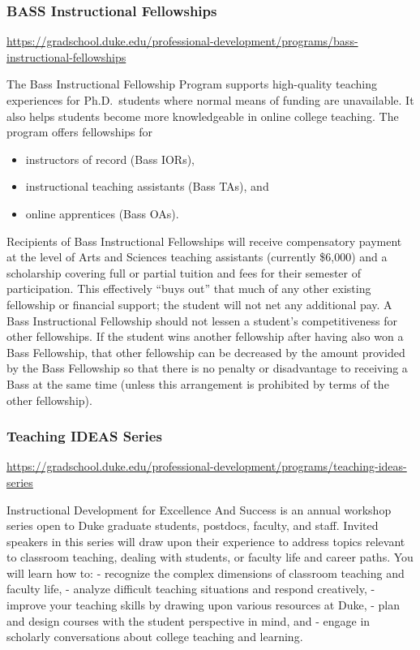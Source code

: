 \documentclass[
]{article}
\providecommand{\tightlist}{%
  \setlength{\itemsep}{0pt}\setlength{\parskip}{0pt}}
\begin{document}
\hypertarget{bass-instructional-fellowships}{%
\subsubsection{BASS Instructional Fellowships}\label{bass-instructional-fellowships}}

\url{https://gradschool.duke.edu/professional-development/programs/bass-instructional-fellowships}

The Bass Instructional Fellowship Program supports high-quality teaching experiences for Ph.D.~students where normal means of funding are unavailable. It also helps students become more knowledgeable in online college teaching. The program offers fellowships for

\begin{itemize}
\tightlist
\item
  instructors of record (Bass IORs),
\item
  instructional teaching assistants (Bass TAs), and
\item
  online apprentices (Bass OAs).
\end{itemize}

Recipients of Bass Instructional Fellowships will receive compensatory payment at the level of Arts and Sciences teaching assistants (currently \$6,000) and a scholarship covering full or partial tuition and fees for their semester of participation. This effectively ``buys out'' that much of any other existing fellowship or financial support; the student will not net any additional pay. A Bass Instructional Fellowship should not lessen a student's competitiveness for other fellowships. If the student wins another fellowship after having also won a Bass Fellowship, that other fellowship can be decreased by the amount provided by the Bass Fellowship so that there is no penalty or disadvantage to receiving a Bass at the same time (unless this arrangement is prohibited by terms of the other fellowship).

\hypertarget{teaching-ideas-series}{%
\subsubsection{Teaching IDEAS Series}\label{teaching-ideas-series}}

\url{https://gradschool.duke.edu/professional-development/programs/teaching-ideas-series}

Instructional Development for Excellence And Success is an annual workshop series open to Duke graduate students, postdocs, faculty, and staff. Invited speakers in this series will draw upon their experience to address topics relevant to classroom teaching, dealing with students, or faculty life and career paths. You will learn how to:
- recognize the complex dimensions of classroom teaching and faculty life,
- analyze difficult teaching situations and respond creatively,
- improve your teaching skills by drawing upon various resources at Duke,
- plan and design courses with the student perspective in mind, and
- engage in scholarly conversations about college teaching and learning.
\end{document}
